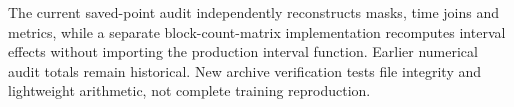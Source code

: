 The current saved-point audit independently reconstructs masks, time joins and metrics, while a separate block-count-matrix implementation recomputes interval effects without importing the production interval function. Earlier numerical audit totals remain historical. New archive verification tests file integrity and lightweight arithmetic, not complete training reproduction.

